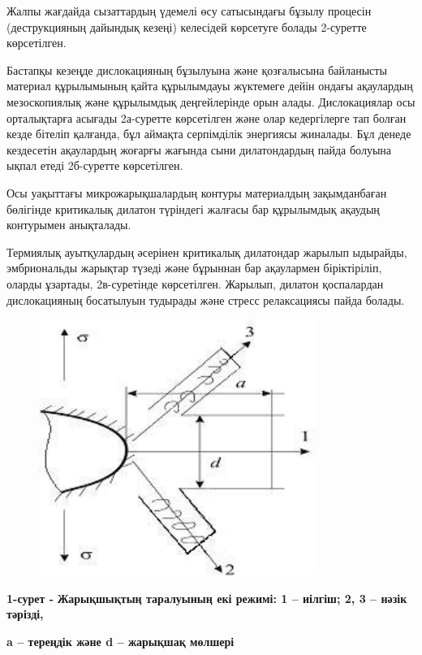 Жалпы жағдайда сызаттардың үдемелі өсу сатысындағы бұзылу процесін
(деструкцияның дайындық кезеңі) келесідей көрсетуге болады 2-суретте
көрсетілген.

Бастапқы кезеңде дислокацияның бұзылуына және қозғалысына байланысты
материал құрылымының қайта құрылымдауы жүктемеге дейін ондағы ақаулардың
мезоскопиялық және құрылымдық деңгейлерінде орын алады. Дислокациялар
осы орталықтарға асығады 2а-суретте көрсетілген және олар кедергілерге
тап болған кезде бітеліп қалғанда, бұл аймақта серпімділік энергиясы
жиналады. Бұл денеде кездесетін ақаулардың жоғарғы жағында сыни
дилатондардың пайда болуына ықпал етеді 2б-суретте көрсетілген.

Осы уақыттағы микрожарықшалардың контуры материалдың зақымданбаған
бөлігінде критикалық дилатон түріндегі жалғасы бар құрылымдық ақаудың
контурымен анықталады.

Термиялық ауытқулардың әсерінен критикалық дилатондар жарылып ыдырайды,
эмбриональды жарықтар түзеді және бұрыннан бар ақаулармен біріктіріліп,
оларды ұзартады, 2в-суретінде көрсетілген. Жарылып, дилатон қоспалардан
дислокацияның босатылуын тудырады және стресс релаксациясы пайда болады.

\begin{figure}[H]
	\centering
	\includegraphics[width=0.8\textwidth]{assets/1319}
	\caption*{}
\end{figure}

{\bfseries 1-сурет -} {\bfseries Жарықшықтың таралуының екі режимі: 1 --
иілгіш; 2, 3 -- нәзік тәрізді,}

{\bfseries a -- тереңдік және d -- жарықшақ мөлшері}

